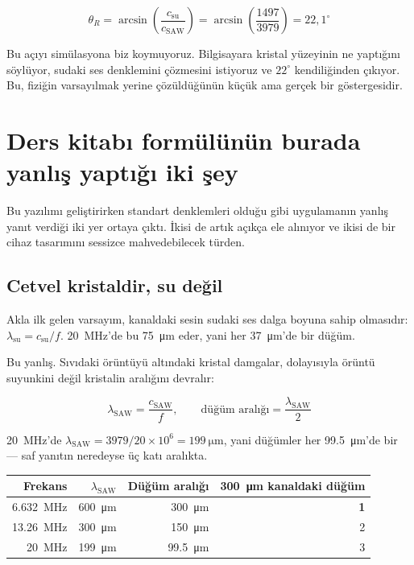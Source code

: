 \documentclass[11pt,a4paper]{article}
\begin{document}
\begin{equation}
\theta_R = \arcsin\!\left(\frac{c_{\text{su}}}{c_{\text{SAW}}}\right)
= \arcsin\!\left(\frac{1497}{3979}\right) = 22{,}1^\circ
\end{equation}

Bu açıyı simülasyona biz koymuyoruz. Bilgisayara kristal yüzeyinin ne yaptığını
söylüyor, sudaki ses denklemini çözmesini istiyoruz ve $22^\circ$ kendiliğinden
çıkıyor. Bu, fiziğin varsayılmak yerine çözüldüğünün küçük ama gerçek bir
göstergesidir.

\clearpage
\section{Ders kitabı formülünün burada yanlış yaptığı iki şey}

Bu yazılımı geliştirirken standart denklemleri olduğu gibi uygulamanın yanlış
yanıt verdiği iki yer ortaya çıktı. İkisi de artık açıkça ele alınıyor ve ikisi
de bir cihaz tasarımını sessizce mahvedebilecek türden.

\subsection{Cetvel kristaldir, su değil}
\label{sec:ruler}

Akla ilk gelen varsayım, kanaldaki sesin sudaki ses dalga boyuna sahip
olmasıdır: $\lambda_{\text{su}} = c_{\text{su}}/f$. \SI{20}{\mega\hertz}'de bu
\SI{75}{\micro\meter} eder, yani her \SI{37}{\micro\meter}'de bir düğüm.

Bu yanlış. Sıvıdaki örüntüyü altındaki kristal damgalar, dolayısıyla örüntü
suyunkini değil kristalin aralığını devralır:

\begin{equation}
\lambda_{\text{SAW}} = \frac{c_{\text{SAW}}}{f},
\qquad
\text{düğüm aralığı} = \frac{\lambda_{\text{SAW}}}{2}
\end{equation}

\SI{20}{\mega\hertz}'de $\lambda_{\text{SAW}} = 3979/20\times10^{6} =
\SI{199}{\micro\meter}$, yani düğümler her \SI{99,5}{\micro\meter}'de bir ---
saf yanıtın neredeyse üç katı aralıkta.

\begin{center}\small
\begin{tabular}{rrrr}
\toprule
\textbf{Frekans} & \textbf{$\lambda_{\text{SAW}}$} & \textbf{Düğüm aralığı} &
\textbf{\SI{300}{\micro\meter} kanaldaki düğüm} \\
\midrule
\SI{6,632}{\mega\hertz} & \SI{600}{\micro\meter} & \SI{300}{\micro\meter} & \textbf{1} \\
\SI{13,26}{\mega\hertz} & \SI{300}{\micro\meter} & \SI{150}{\micro\meter} & 2 \\
\SI{20}{\mega\hertz}    & \SI{199}{\micro\meter} & \SI{99,5}{\micro\meter} & 3 \\
\bottomrule
\end{tabular}
\end{center}
\end{document}
